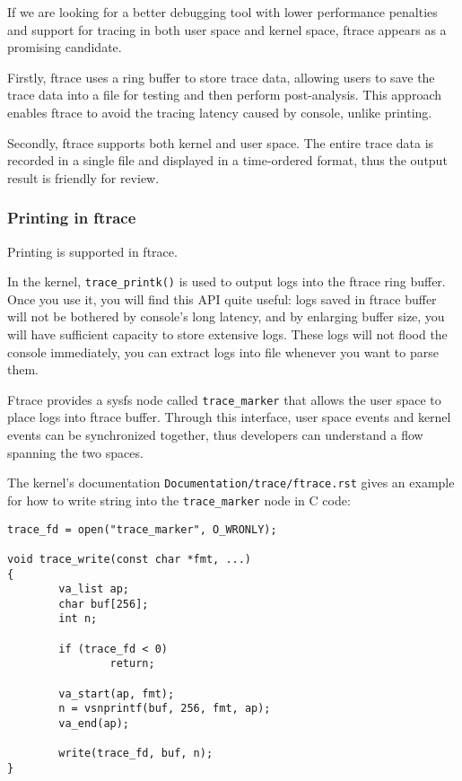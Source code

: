 \documentclass[11pt]{diazessay} %
\def\code#1{\texttt{#1}}
\begin{document}
If we are looking for a better debugging tool with lower performance penalties
and support for tracing in both user space and kernel space, ftrace appears as
a promising candidate.

Firstly, ftrace uses a ring buffer to store trace data, allowing users to save
the trace data into a file for testing and then perform post-analysis. This
approach enables ftrace to avoid the tracing latency caused by console, unlike
printing.

Secondly, ftrace supports both kernel and user space. The entire trace data is
recorded in a single file and displayed in a time-ordered format, thus the
output result is friendly for review.

\subsubsection*{Printing in ftrace}

Printing is supported in ftrace.

In the kernel, \code{trace\_printk()} is used to output logs into the ftrace
ring buffer. Once you use it, you will find this API quite useful: logs saved
in ftrace buffer will not be bothered by console's long latency, and by
enlarging buffer size, you will have sufficient capacity to store extensive
logs. These logs will not flood the console immediately, you can extract logs
into file whenever you want to parse them.

Ftrace provides a sysfs node called \code{trace\_marker} that allows the user
space to place logs into ftrace buffer. Through this interface, user space
events and kernel events can be synchronized together, thus developers can
understand a flow spanning the two spaces.

The kernel's documentation \code{Documentation/trace/ftrace.rst} gives an
example for how to write string into the \code{trace\_marker} node in C code:

\begin{lstlisting}
trace_fd = open("trace_marker", O_WRONLY);

void trace_write(const char *fmt, ...)
{
        va_list ap;
        char buf[256];
        int n;

        if (trace_fd < 0)
                return;

        va_start(ap, fmt);
        n = vsnprintf(buf, 256, fmt, ap);
        va_end(ap);

        write(trace_fd, buf, n);
}
\end{lstlisting}
\end{document}
